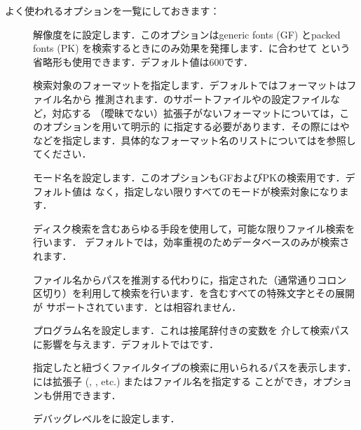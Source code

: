 \documentclass[uplatex,dvipdfmx]{jsarticle}
\begin{document}
よく使われるオプションを一覧にしておきます：
%
\begin{description}
\item[]
解像度をに設定します．このオプションはgeneric fonts (GF) とpacked
fonts (PK) を検索するときにのみ効果を発揮します．に合わせて%
という省略形も使用できます．デフォルト値は600です．

\item[]
検索対象のフォーマットを指定します．デフォルトではフォーマットはファイル名から
推測されます．\MP のサポートファイルやの設定ファイルなど，対応する
（曖昧でない）拡張子がないフォーマットについては，このオプションを用いて明示的
に指定する必要があります．その際にはやなどを指定します．具体的なフォーマット名のリストについてはを参照してください．

\item[]
モード名を設定します．このオプションもGFおよびPKの検索用です．デフォルト値は
なく，指定しない限りすべてのモードが検索対象になります．

\item[]
ディスク検索を含むあらゆる手段を使用して，可能な限りファイル検索を行います．
デフォルトでは，効率重視のためデータベースのみが検索されます．

\item[]
ファイル名からパスを推測する代わりに，指定された（通常通りコロン
区切り）を利用して検索を行います．\samp{//}を含むすべての特殊文字とその展開が
サポートされています．とは相容れません．

\item[]
プログラム名を設定します．これは接尾辞付きの変数を
介して検索パスに影響を与えます．デフォルトではです．

\item[]
指定したと紐づくファイルタイプの検索に用いられるパスを表示します．
には拡張子 (, , etc.) またはファイル名を指定する
ことができ，オプションも併用できます．

\item[]
デバッグレベルをに設定します．
\end{description}
\end{document}
